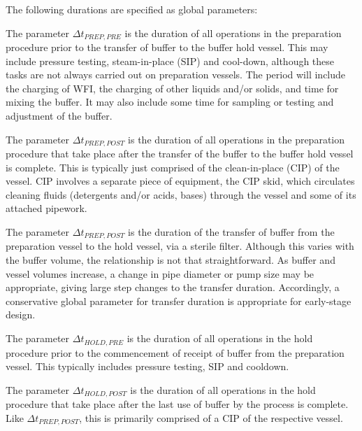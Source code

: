 The following durations are specified as global parameters:

The parameter $\Delta t_{\mathit{PREP,PRE}}$ is the duration of all operations
in the preparation procedure prior to the transfer of buffer to the buffer hold
vessel.  
This may include pressure testing, steam-in-place (SIP) and cool-down, although
these tasks are not always carried out on preparation vessels.
The period will include the charging of WFI, the charging of other liquids
and/or solids, and time for mixing the buffer.
It may also include some time for sampling or testing and adjustment of the
buffer.

The parameter $\Delta t_{\mathit{PREP,POST}}$ is the duration of all operations
in the preparation procedure that take place after the transfer of the buffer
to the buffer hold vessel is complete.
This is typically just comprised of the clean-in-place (CIP) of the vessel.
CIP involves a separate piece of equipment, the CIP skid, which circulates
cleaning fluids (detergents and/or acids, bases) through the vessel and some of
its attached pipework.

The parameter $\Delta t_{\mathit{PREP,POST}}$ is the duration of the transfer
of buffer from the preparation vessel to the hold vessel, via a sterile filter.
Although this varies with the buffer volume, the relationship is not that
straightforward.
As buffer and vessel volumes increase, a change in pipe diameter or pump size
may be appropriate, giving large step changes to the transfer duration.
Accordingly, a conservative global parameter for transfer duration is
appropriate for early-stage design.

The parameter $\Delta t_{\mathit{HOLD,PRE}}$ is the duration of all operations
in the hold procedure prior to the commencement of receipt of buffer from the
preparation vessel.
This typically includes pressure testing, SIP and cooldown.

The parameter $\Delta t_{\mathit{HOLD,POST}}$ is the duration of all operations
in the hold procedure that take place after the last use of buffer by the
process is complete.
Like $\Delta t_{\mathit{PREP,POST}}$, this is primarily comprised of a CIP of
the respective vessel.

